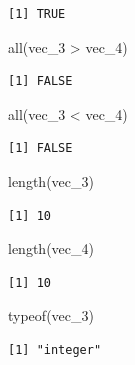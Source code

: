 \documentclass[
  letterpaper,
  DIV=11,
  numbers=noendperiod]{scrreprt}
\newenvironment{Shaded}{\begin{snugshade}}{\end{snugshade}}
\newcommand{\FunctionTok}[1]{\textcolor[rgb]{0.28,0.35,0.67}{#1}}
\newcommand{\NormalTok}[1]{\textcolor[rgb]{0.00,0.23,0.31}{#1}}
\newcommand{\SpecialCharTok}[1]{\textcolor[rgb]{0.37,0.37,0.37}{#1}}
\begin{document}
\begin{verbatim}
[1] TRUE
\end{verbatim}

\begin{Shaded}
\begin{Highlighting}[]
\FunctionTok{all}\NormalTok{(vec\_3 }\SpecialCharTok{\textgreater{}}\NormalTok{ vec\_4)}
\end{Highlighting}
\end{Shaded}

\begin{verbatim}
[1] FALSE
\end{verbatim}

\begin{Shaded}
\begin{Highlighting}[]
\FunctionTok{all}\NormalTok{(vec\_3 }\SpecialCharTok{\textless{}}\NormalTok{ vec\_4)}
\end{Highlighting}
\end{Shaded}

\begin{verbatim}
[1] FALSE
\end{verbatim}

\begin{Shaded}
\begin{Highlighting}[]
\FunctionTok{length}\NormalTok{(vec\_3)}
\end{Highlighting}
\end{Shaded}

\begin{verbatim}
[1] 10
\end{verbatim}

\begin{Shaded}
\begin{Highlighting}[]
\FunctionTok{length}\NormalTok{(vec\_4)}
\end{Highlighting}
\end{Shaded}

\begin{verbatim}
[1] 10
\end{verbatim}

\begin{Shaded}
\begin{Highlighting}[]
\FunctionTok{typeof}\NormalTok{(vec\_3)}
\end{Highlighting}
\end{Shaded}

\begin{verbatim}
[1] "integer"
\end{verbatim}
\end{document}
